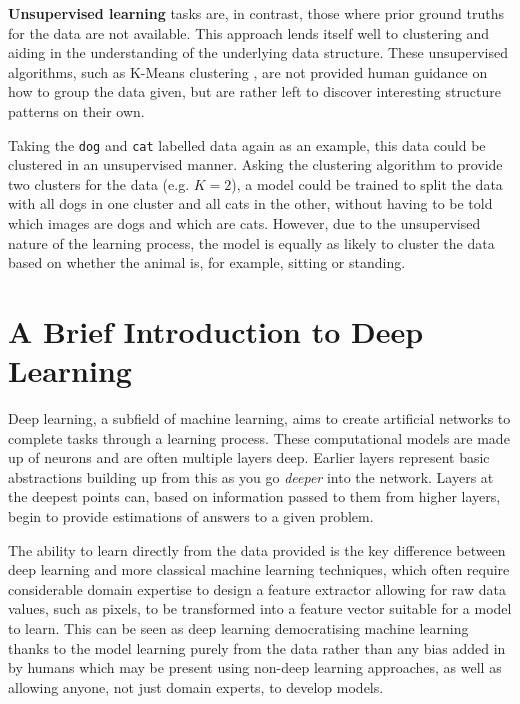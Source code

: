 \textbf{Unsupervised learning} tasks are, in contrast, those where prior ground truths for the data are not available. This approach lends itself well to clustering and aiding in the understanding of the underlying data structure. These unsupervised algorithms, such as K-Means clustering \cite{hartigan_algorithm_1979}, are not provided human guidance on how to group the data given, but are rather left to discover interesting structure patterns on their own. 

Taking the \texttt{dog} and \texttt{cat} labelled data again as an example, this data could be clustered in an unsupervised manner. Asking the clustering algorithm to provide two clusters for the data  (e.g. $K = 2$), a model could be trained to split the data with all dogs in one cluster and all cats in the other, without having to be told which images are dogs and which are cats. However, due to the unsupervised nature of the learning process, the model is equally as likely to cluster the data based on whether the animal is, for example, sitting or standing. 

\section{A Brief Introduction to Deep Learning}\label{ch:Background,sec:DLIntro}

Deep learning, a subfield of machine learning, aims to create artificial networks to complete tasks through a learning process. These computational models are made up of neurons and are often multiple layers deep. Earlier layers represent basic abstractions building up from this as you go \textit{deeper} into the network. Layers at the deepest points can, based on information passed to them from higher layers, begin to provide estimations of answers to a given problem.

The ability to learn directly from the data provided is the key difference between deep learning and more classical machine learning techniques, which often require considerable domain expertise to design a feature extractor allowing for raw data values, such as pixels, to be transformed into a feature vector suitable for a model to learn. This can be seen as deep learning democratising machine learning thanks to the model learning purely from the data rather than any bias added in by humans which may be present using non-deep learning approaches, as well as allowing anyone, not just domain experts, to develop models.

